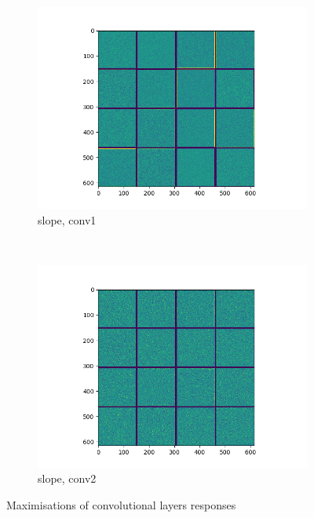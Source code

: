 \documentclass[11pt,a4paper]{article}
\begin{document}
\begin{figure}[t]
\begin{subfigure}[b]{0.2\textwidth}
        \includegraphics[width=\textwidth]{graphics/nn_visualisation/convnet_filters_slope_conv2d.png}
        \caption{slope, conv1}
    \end{subfigure}
    ~
    \begin{subfigure}[b]{0.2\textwidth}
        \includegraphics[width=\textwidth]{graphics/nn_visualisation/convnet_filters_slope_conv2d_1.png}
        \caption{slope, conv2}
    \end{subfigure}

    \caption{Maximisations of convolutional layers responses}
    \label{fig:nn_vis_conv_filters}
\end{figure}
\end{document}
